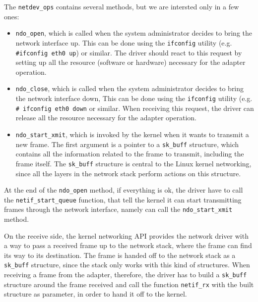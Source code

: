 The \texttt{netdev\_ops} contains several methods, but we are intersted only in a few ones:
\begin{itemize}
    \item \texttt{ndo\_open}, which is called when the system administrator decides to bring the network interface up. This can be done
	  using the \texttt{ifconfig} utility (e.g. \texttt{\#ifconfig eth0 up}) or similar. The driver should react to this request by
	  setting up all the resource (software or hardware) necessary for the adapter operation.
	  
    \item \texttt{ndo\_close}, which is called when the system administrator decides to bring the network interface down, This can be
	  done using the \texttt{ifconfig} utility (e.g. \texttt{\# ifconfig eth0 down} or similar. When receiving this request,
	  the driver can release all the resource necessary for the adapter operation.
	  
    \item \texttt{ndo\_start\_xmit}, which is invoked by the kernel when it wants to transmit a new frame. The first argument is
	  a pointer to a \texttt{sk\_buff} structure, which contains all the information related to the frame to transmit, including
	  the frame itself. The \texttt{sk\_buff} structure is central to the Linux kernel networking, since all the layers in the 
	  network stack perform actions on this structure.
	 
\end{itemize}

At the end of the \texttt{ndo\_open} method, if everything is ok, the driver have to call the \texttt{netif\_start\_queue} function,
that tell the kernel it can start transmitting frames through the network interface, namely can call the \texttt{ndo\_start\_xmit}
method.

\vspace{0.5cm}

On the receive side, the kernel networking API provides the network driver with a way to pass a received frame up to the network
stack, where the frame can find its way to its destination.
The frame is handed off to the network stack as a \texttt{sk\_buff} structure, since the stack only works with this kind of structures.
When receiving a frame from the adapter, therefore, the driver has to build a \texttt{sk\_buff} structure around the frame received
and call the function \texttt{netif\_rx} with the built structure as parameter, in order to hand it off to the kernel.

